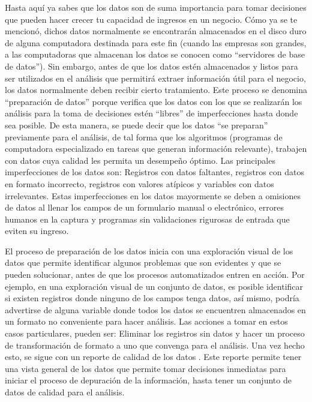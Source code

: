 \documentclass[]{book}
\begin{document}
Hasta aquí ya sabes que los datos son de suma importancia para tomar
decisiones que pueden hacer crecer tu capacidad de ingresos en un
negocio. Cómo ya se te mencionó, dichos datos normalmente se encontrarán
almacenados en el disco duro de alguna computadora destinada para este
fin (cuando las empresas son grandes, a las computadoras que almacenan
los datos se conocen como ``servidores de base de datos''). Sin embargo,
antes de que los datos estén almacenados y listos para ser utilizados en
el análisis que permitirá extraer información útil para el negocio, los
datos normalmente deben recibir cierto tratamiento. Este proceso se
denomina ``preparación de datos'' porque verifica que los datos con los
que se realizarán los análisis para la toma de decisiones estén
``libres'' de imperfecciones hasta donde sea posible. De esta manera, se
puede decir que los datos ``se preparan'' previamente para el análisis,
de tal forma que los algoritmos (programas de computadora especializado
en tareas que generan información relevante), trabajen con datos cuya
calidad les permita un desempeño óptimo. Las principales imperfecciones
de los datos son: Registros con datos faltantes, registros con datos en
formato incorrecto, registros con valores atípicos y variables con datos
irrelevantes. Estas imperfecciones en los datos mayormente se deben a
omisiones de datos al llenar los campos de un formulario manual o
electrónico, errores humanos en la captura y programas sin validaciones
rigurosas de entrada que eviten su ingreso.

El proceso de preparación de los datos inicia con una exploración visual
de los datos que permite identificar algunos problemas que son evidentes
y que se pueden solucionar, antes de que los procesos automatizados
entren en acción. Por ejemplo, en una exploración visual de un conjunto
de datos, es posible identificar si existen registros donde ninguno de
los campos tenga datos, así mismo, podría advertirse de alguna variable
donde todos los datos se encuentren almacenados en un formato no
conveniente para hacer análisis. Las acciones a tomar en estos casos
particulares, pueden ser: Eliminar los registros sin datos y hacer un
proceso de transformación de formato a uno que convenga para el
análisis. Una vez hecho esto, se sigue con un reporte de calidad de los
datos \citep{Kelleher2015}. Este reporte permite tener una vista general
de los datos que permite tomar decisiones inmediatas para iniciar el
proceso de depuración de la información, hasta tener un conjunto de
datos de calidad para el análisis.
\end{document}
